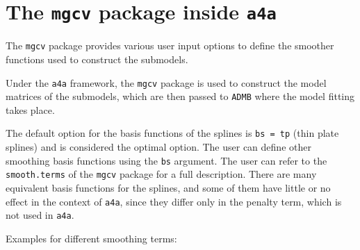 \documentclass[
]{book}
\begin{document}
\hypertarget{the-mgcv-package-inside-a4a}{%
\section{\texorpdfstring{The \texttt{mgcv} package inside \texttt{a4a}}{The mgcv package inside a4a}}\label{the-mgcv-package-inside-a4a}}

The \texttt{mgcv} package provides various user input options to define the smoother functions used to construct the submodels.

Under the \texttt{a4a} framework, the \texttt{mgcv} package is used to construct the model matrices of the submodels, which are then passed to \texttt{ADMB} where the model fitting takes place.

The default option for the basis functions of the splines is \texttt{bs\ =\ tp} (thin plate splines) and is considered the optimal option. The user can define other smoothing basis functions using the \texttt{bs} argument. The user can refer to the \texttt{smooth.terms} of the \texttt{mgcv} package for a full description. There are many equivalent basis functions for the splines, and some of them have little or no effect in the context of \texttt{a4a}, since they differ only in the penalty term, which is not used in \texttt{a4a}.

Examples for different smoothing terms:
\end{document}
